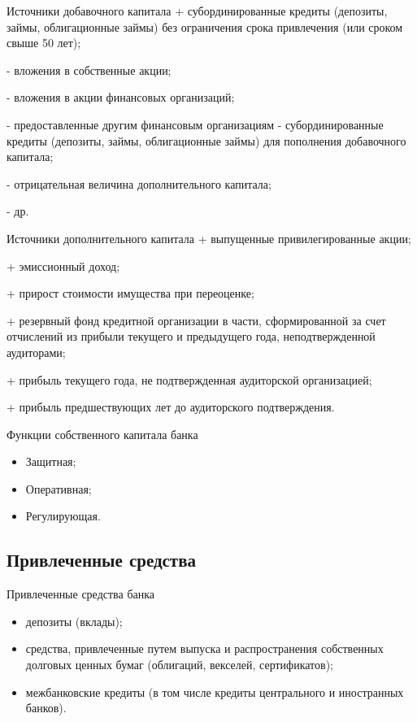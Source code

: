 \documentclass[_Banking_p2.tex]{subfiles}
\begin{document}
\begin{frame}{Источники добавочного капитала}
+ субординированные кредиты (депозиты, займы, облигационные займы) без ограничения срока привлечения (или сроком свыше 50 лет);

- вложения в собственные акции;

- вложения в акции финансовых организаций;

- предоставленные другим финансовым организациям - субординированные кредиты (депозиты, займы, облигационные займы) для пополнения добавочного капитала;

- отрицательная величина дополнительного капитала;

- др.

\end{frame}

\begin{frame}{Источники дополнительного капитала}
+ выпущенные привилегированные акции;

+ эмиссионный доход;

+ прирост стоимости имущества при переоценке;

+ резервный фонд кредитной организации в части, сформированной за счет отчислений из прибыли текущего и предыдущего года, неподтвержденной аудиторами;

+ прибыль текущего года, не подтвержденная аудиторской организацией;

+ прибыль предшествующих лет до аудиторского подтверждения.

\end{frame}

\begin{frame}{Функции собственного капитала банка}
\begin{itemize}
\item
Защитная;
\item
Оперативная;
\item
Регулирующая.
\end{itemize}
\end{frame}

\subsection{Привлеченные средства}
\begin{frame}{Привлеченные средства банка}{}
\begin{itemize}[<+->]
\item
депозиты (вклады);
\item
средства, привлеченные путем выпуска и распространения собственных долговых ценных бумаг (облигаций, векселей, сертификатов);
\item
межбанковские кредиты (в том числе кредиты центрального и иностранных банков).
\end{itemize}
\end{frame}
\end{document}
